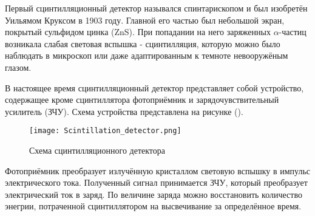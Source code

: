 Первый сцинтилляционный детектор назывался спинтарископом и был изобретён Уильямом Круксом в 1903 году. Главной его частью был небольшой экран, покрытый сульфидом цинка (ZnS). При попадании на него заряженных $\alpha$-частиц возникала слабая световая вспышка - сцинтилляция, которую можно было наблюдать в микроскоп или даже адаптированным к темноте невооружёным глазом.\par
В настоящее время сцинтилляционный детектор представляет собой устройство, содержащее кроме сцинтиллятора фотоприёмник и зарядочувствительный усилитель (ЗЧУ). Схема устройства представлена на рисунке ().\par
\begin{figure}[ht]
    \centering
    \texttt{[image: Scintillation\_detector.png]}
    \caption{Схема сцинтилляционного детектора}
    \label{fig:mpr}
\end{figure}
Фотоприёмник преобразует излучённую кристаллом световую вспышку в импульс электрического тока. Полученный сигнал принимается ЗЧУ, который преобразует электрический ток в заряд. По величине заряда можно восстановить количество энегрии, потраченной сцинтиллятором на высвечивание за определённое время.
